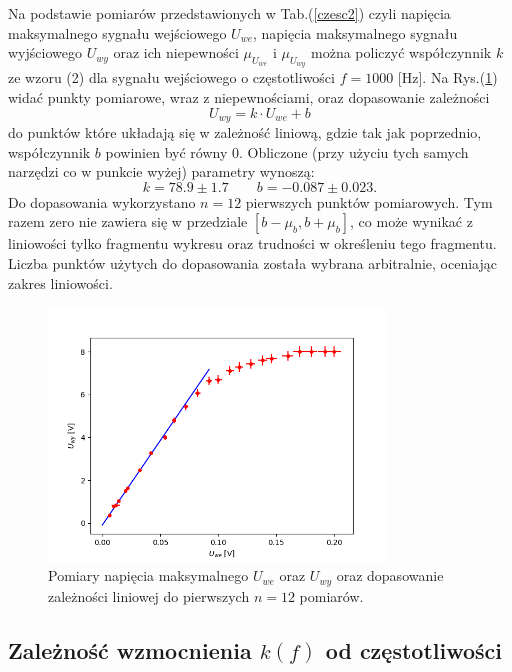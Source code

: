\documentclass[10pt,a4paper]{article}
\begin{document}
Na podstawie pomiarów przedstawionych w Tab.(\ref{czesc2}) czyli napięcia maksymalnego sygnału wejściowego $U_{we}$, napięcia maksymalnego sygnału wyjściowego $U_{wy}$ oraz ich niepewności $\mu_{U_{we}}$ i $\mu_{U_{wy}}$ można policzyć współczynnik $k$ ze wzoru (2) dla sygnału wejściowego o częstotliwości $f = 1000 $ [Hz]. Na Rys.(\ref{fig_2}) widać punkty pomiarowe, wraz z niepewnościami, oraz dopasowanie zależności 
$$ U_{wy} = k \cdot U_{we} + b $$ do punktów które układają się w zależność liniową, gdzie tak jak poprzednio, współczynnik $b$ powinien być równy 0. Obliczone (przy użyciu tych samych narzędzi co w punkcie wyżej) parametry wynoszą:
$$ k = 78.9 \pm 1.7 \qquad b = -0.087 \pm 0.023.$$ Do dopasowania wykorzystano $n = 12$ pierwszych punktów pomiarowych. Tym razem zero nie zawiera się w przedziale $[b - \mu_b, b + \mu_b]$, co może wynikać z liniowości tylko fragmentu wykresu oraz trudności w określeniu tego fragmentu. Liczba punktów użytych do dopasowania została wybrana arbitralnie, oceniając zakres liniowości. 
\begin{figure}[ht!]	
	\begin{center}
		\includegraphics[width = 0.8\textwidth]{Figure_2.png}
		\caption{Pomiary napięcia maksymalnego $U_{we}$ oraz $U_{wy}$ oraz dopasowanie zależności liniowej do pierwszych $n=12$ pomiarów.}
		\label{fig_2}
	\end{center}
\end{figure}	

\subsection*{Zależność wzmocnienia $k(f)$ od częstotliwości}
\end{document}
